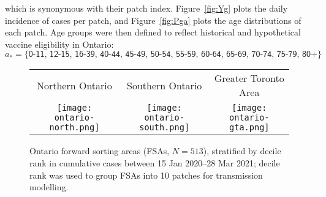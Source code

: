 which is synonymous with their patch index.
Figure~\ref{fig:Yg} plots the daily incidence of \covid cases per patch, and
Figure~\ref{fig:Pga} plots the age distributions of each patch.
Age groups were then defined to reflect historical and hypothetical \covid vaccine eligibility in Ontario:
\begin{equation}
  a_* = \big\{\textsf{0-11, 12-15, 16-39, 40-44, 45-49, 50-54, 55-59, 60-64, 65-69, 70-74, 75-79, 80+}\big\}
\end{equation}
\begin{figure}
  \centering
  \setlength{\tabcolsep}{0pt}
  \begin{tabular}{ccc}
    Northern Ontario & Southern Ontario & Greater Toronto Area\\
    \texttt{[image: ontario-north.png]} &
    \texttt{[image: ontario-south.png]} &
    \texttt{[image: ontario-gta.png]}
  \end{tabular}
  \caption{Ontario forward sorting areas (FSAs, $N=513$),
    stratified by decile rank in cumulative \covid cases between 15 Jan 2020--28 Mar 2021;
    decile rank was used to group FSAs into 10 patches for transmission modelling.}
  \label{fig:map}
\end{figure}
